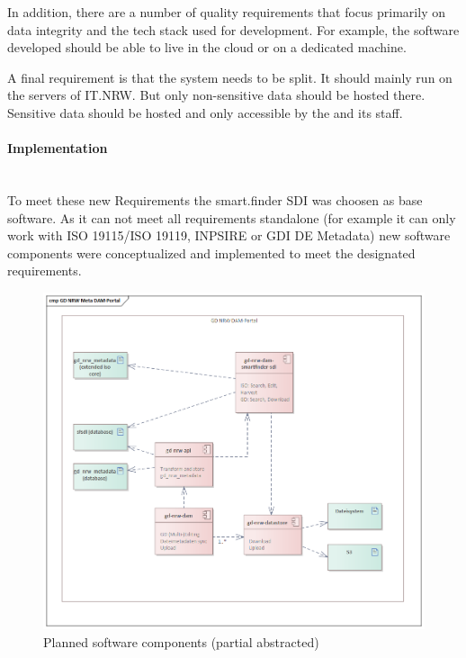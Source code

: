 \documentclass[11pt, titlepage, a4paper]{article}
\newcommand{\myparagraph}[1]{\paragraph{#1}\mbox{}\\}
\begin{document}
In addition, there are a number of quality requirements that focus primarily on data integrity and the tech stack used for development. For example, the software developed should be able to live in the cloud or on a dedicated machine.

A final requirement is that the system needs to be split. It should mainly run on the servers of IT.NRW. But only non-sensitive data should be hosted there. Sensitive data should be hosted and only accessible by the  and its staff.

\myparagraph{Implementation}
To meet these new Requirements the smart.finder SDI was choosen as base software. As it can not meet all requirements standalone (for example it can only work with ISO 19115/ISO 19119, INPSIRE or GDI DE Metadata) new software components were conceptualized and implemented to meet the designated requirements.

\begin{figure}[t]
	\caption{Planned software components (partial abstracted)}
	\label{fig:components}
	\includegraphics[width=16cm]{components.png}
	\centering
\end{figure}
\end{document}
